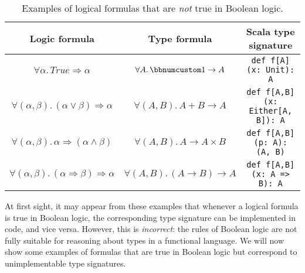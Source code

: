 \begin{table}[h]
\begin{centering}
\begin{tabular}{|c|c|c|}
\hline 
\textbf{\small{}Logic formula} & \textbf{\small{}Type formula} & \textbf{\small{}Scala type signature}\tabularnewline
\hline 
\hline 
{\footnotesize{}$\forall\alpha.\,True\Rightarrow\alpha$} & {\footnotesize{}$\forall A.\,\bbnum 1\rightarrow A$} & \lstinline!def f[A](x: Unit): A!\tabularnewline
\hline 
{\footnotesize{}$\forall(\alpha,\beta).\,(\alpha\vee\beta)\Rightarrow\alpha$} & {\footnotesize{}$\forall(A,B).\,A+B\rightarrow A$} & \lstinline!def f[A,B](x: Either[A, B]): A!\tabularnewline
\hline 
{\footnotesize{}$\forall(\alpha,\beta).\,\alpha\Rightarrow(\alpha\wedge\beta)$} & {\footnotesize{}$\forall(A,B).\,A\rightarrow A\times B$} & \lstinline!def f[A,B](p: A): (A, B)!\tabularnewline
\hline 
{\footnotesize{}$\forall(\alpha,\beta).\,(\alpha\Rightarrow\beta)\Rightarrow\alpha$} & {\footnotesize{}$\forall(A,B).\,(A\rightarrow B)\rightarrow A$} & \lstinline!def f[A,B](x: A => B): A!\tabularnewline
\hline 
\end{tabular}
\par\end{centering}
\caption{Examples of logical formulas that are \emph{not} true in Boolean logic.\label{tab:Logical-formulas-not-Boolean-theorems}}
\end{table}

At first sight, it may appear from these examples that whenever a
logical formula is true in Boolean logic, the corresponding type signature
can be implemented in code, and vice versa. However, this is \emph{incorrect}:
the rules of Boolean logic are not fully suitable for reasoning about
types in a functional language. We will now show some examples of
formulas that are true in Boolean logic but correspond to unimplementable
type signatures.

